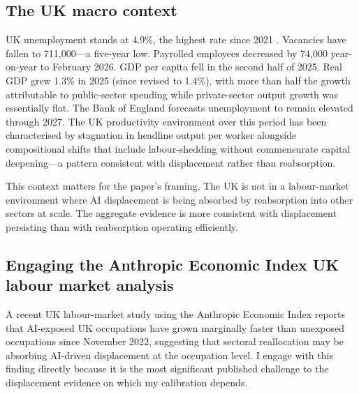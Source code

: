 \documentclass[11pt,letterpaper]{article}
\theoremstyle{remark}
\begin{document}
\subsection{The {UK} macro context}

{UK} unemployment stands at 4.9\%, the highest rate since 2021 \citep{obr_2026}. Vacancies have fallen to 711{,}000---a five-year low. Payrolled employees decreased by 74{,}000 year-on-year to February 2026. {GDP} per capita fell in the second half of 2025. Real {GDP} grew 1.3\% in 2025 (since revised to 1.4\%), with more than half the growth attributable to public-sector spending while private-sector output growth was essentially flat. The Bank of England forecasts unemployment to remain elevated through 2027. The {UK} productivity environment over this period has been characterised by stagnation in headline output per worker alongside compositional shifts that include labour-shedding without commensurate capital deepening---a pattern consistent with displacement rather than reabsorption.

This context matters for the paper's framing. The {UK} is not in a labour-market environment where {AI} displacement is being absorbed by reabsorption into other sectors at scale. The aggregate evidence is more consistent with displacement persisting than with reabsorption operating efficiently.

\subsection{Engaging the {Anthropic Economic Index} {UK} labour market analysis}

A recent {UK} labour-market study using the {Anthropic Economic Index} \citep{british_progress_2026} reports that {AI}-exposed {UK} occupations have grown marginally faster than unexposed occupations since November 2022, suggesting that sectoral reallocation may be absorbing {AI}-driven displacement at the occupation level. I engage with this finding directly because it is the most significant published challenge to the displacement evidence on which my calibration depends.
\end{document}
